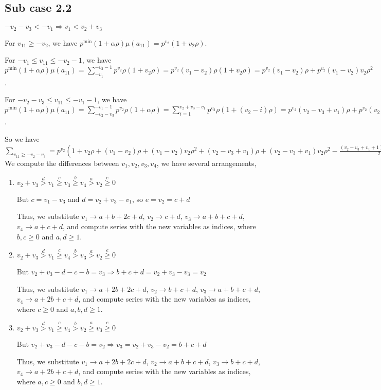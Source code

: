\documentclass{article}
\begin{document}
\subsection{Sub case 2.2}
$-v_2-v_3<{-v_1}\Rightarrow{v_1<{v_2+v_3}}$

For $v_{11}\geq{-v_2}$, we have $p^{\min}(1+\alpha\rho)\mu(a_{11})=p^{v_2}(1+v_2\rho)$.

For $-v_1\leq{v_{11}}\leq{-v_2-1}$, we have $p^{\min}(1+\alpha\rho)\mu(a_{11})=\sum_{-v_1}^{-v_2-1}p^{v_2}\rho(1+v_2\rho)=p^{v_2}(v_1-v_2)\rho(1+v_2\rho)=p^{v_2}(v_1-v_2)\rho+p^{v_2}(v_1-v_2)v_2\rho^2$.

For $-v_2-v_3\leq{v_{11}}\leq{-v_1-1}$, we have $p^{\min}(1+\alpha\rho)\mu(a_{11})=\sum_{-v_2-v_3}^{-v_1-1}p^{v_2}\rho(1+\alpha\rho)=\sum_{i=1}^{v_2+v_3-v_1}p^{v_2}\rho(1+(v_2-i)\rho)=p^{v_2}(v_2-v_3+v_1)\rho+p^{v_2}(v_2-v_3+v_1)v_2\rho^2-p^{v_2}\binom{v_2+v_3-v_1+1}{2}\rho^2$.

So we have $\sum_{v_{11}\geq{-v_2-v_3}}=p^{v_2}(1+v_2\rho+(v_1-v_2)\rho+(v_1-v_2)v_2\rho^2+(v_2-v_3+v_1)\rho+(v_2-v_3+v_1)v_2\rho^2-\frac{(v_2-v_3+v_1+1)(v_2-v_3+v_1)}{2}\rho^2).$
We compute the differences between $v_1,v_2,v_3,v_4$, we have several arrangements,
\begin{enumerate}
    \item 
$v_2+v_3\overset{d}{>}v_1\overset{c}{\geq}v_3\overset{b}{\geq}{v_4}\overset{a}>v_2\overset{e}{\geq}{0}$

But $c=v_1-v_3$ and $d=v_2+v_3-v_1$, so $e=v_2=c+d$

Thus, we substitute $v_1\rightarrow{a+b+2c+d}$, $v_2\rightarrow{c+d}$, $v_3\rightarrow{a+b+c+d}$, $v_4\rightarrow{a+c+d}$, and compute series with the new variables as indices, where $b,c\geq{0}$ and $a,d\geq{1}$.

\item 
$v_2+v_3\overset{d}{>}v_1\overset{c}{\geq}v_4\overset{b}{>}{v_3}\overset{a}>v_2\overset{e}{\geq}{0}$

But $v_2+v_3-d-c-b=v_3\Rightarrow{b+c+d=v_2+v_3-v_3=v_2}$

Thus, we substitute $v_1\rightarrow{a+2b+2c+d}$, $v_2\rightarrow{b+c+d}$, $v_3\rightarrow{a+b+c+d}$, $v_4\rightarrow{a+2b+c+d}$, and compute series with the new variables as indices, where $c\geq{0}$ and $a,b,d\geq{1}$.

\item 
$v_2+v_3\overset{d}{>}v_1\overset{c}{\geq}v_4\overset{b}{>}{v_2}\overset{a}{\geq}v_3\overset{e}{\geq}{0}$

But $v_2+v_3-d-c-b=v_2\Rightarrow{v_3=v_2+v_3-v_2=b+c+d}$

Thus, we substitute $v_1\rightarrow{a+2b+2c+d}$, $v_2\rightarrow{a+b+c+d}$, $v_3\rightarrow{b+c+d}$, $v_4\rightarrow{a+2b+c+d}$, and compute series with the new variables as indices, where $a,c\geq{0}$ and $b,d\geq{1}$.

\end{enumerate}
\end{document}
